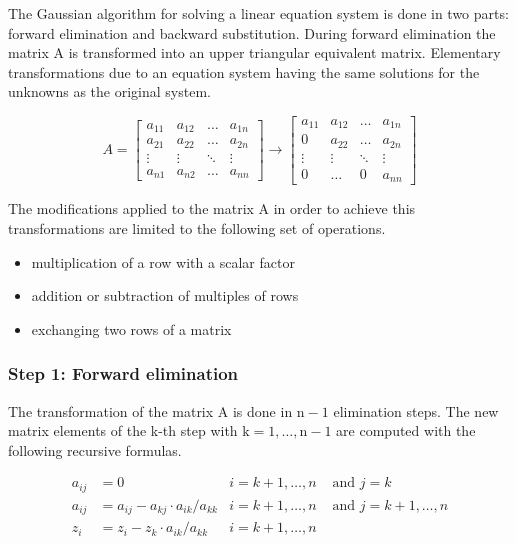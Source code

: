The Gaussian algorithm for solving a linear equation system is done in
two parts: forward elimination and backward substitution.  During
forward elimination the matrix A is transformed into an upper
triangular equivalent matrix.  Elementary transformations due to an
equation system having the same solutions for the unknowns as the
original system.

\begin{equation}
A =
\begin{bmatrix}
a_{11} & a_{12} & \ldots & a_{1n}\\
a_{21} & a_{22} & \ldots & a_{2n}\\
\vdots & \vdots & \ddots & \vdots\\
a_{n1} & a_{n2} & \ldots & a_{nn}
\end{bmatrix}
\rightarrow
\begin{bmatrix}
a_{11} & a_{12} & \ldots & a_{1n}\\
0 & a_{22} & \ldots & a_{2n}\\
\vdots & \vdots & \ddots & \vdots\\
0 & \ldots & 0 & a_{nn}
\end{bmatrix}
\end{equation}

The modifications applied to the matrix A in order to achieve this
transformations are limited to the following set of operations.
\begin{itemize}
\item multiplication of a row with a scalar factor
\item addition or subtraction of multiples of rows
\item exchanging two rows of a matrix
\end{itemize}

\subsubsection{Step 1: Forward elimination}

The transformation of the matrix A is done in $\mathrm{n - 1}$
elimination steps.  The new matrix elements of the k-th step with
$\mathrm{k = 1, \ldots, n - 1}$ are computed with the following
recursive formulas.

\begin{align}
a_{ij} &= 0 & i = k+1, \ldots, n &\text{ and } j = k\\
a_{ij} &= a_{ij} - a_{kj} \cdot a_{ik} / a_{kk} & i = k+1, \ldots, n &\text{ and } j = k+1, \ldots, n\\
z_{i} &= z_{i} - z_{k} \cdot a_{ik} / a_{kk} & i = k+1, \ldots, n &
\end{align}

